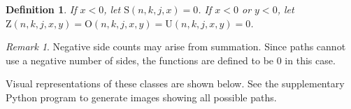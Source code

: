 \documentclass[a4paper, 12pt] {article}
\theoremstyle{remark}
\newtheorem*{remark}{Remark}
\theoremstyle{plain}
\newtheorem{definition}{Definition}[theorem]
\theoremstyle{remark}
\begin{document}
\begin{definition}
\label{nonnegative_side}
If $x<0$, let $\mathrm{S}(n,k,j,x)=0$.
If $x<0$ or $y<0$, let $\mathrm{Z}(n,k,j,x,y)=\mathrm{O}(n,k,j,x,y)=\mathrm{U}(n,k,j,x,y)=0$.
\end{definition}

\begin{remark}
Negative side counts may arise from summation. Since paths cannot use a negative number of sides, the functions are defined to be $0$ in this case.
\end{remark}

Visual representations of these classes are shown below.
See the supplementary Python program to generate images showing all possible paths.


\begin{comment}
Let $\mathbb{Z}_j$, $\mathbb{S}_j$, $\mathbb{O}_j$ be the subclass of $\mathbb{Z}$, $\mathbb{S}$, $\mathbb{O}$ such that all $\{p_k\} \in \mathbb{Z}_j$, $\mathbb{S}_j$, $\mathbb{O}_j$ have no $j$ \textit{consecutive} respectively.
Let $\mathbb{O}_{j}^{c}$ be the subclass of $\mathbb{O}$ such that all $\{p_k\} \in \mathbb{O}_{j}^{c}$ have no $j$ \textit{cyclic-consecutive}.

Let $\mathbb{Z}_j$ be the subclass of $\mathbb{Z}$ such that all $\{p_k\} \in \mathbb{Z}_j$ have no $j$ \textit{consecutive}.
Let $\mathbb{S}_j$ be the subclass of $\mathbb{S}$ such that all $\{p_k\} \in \mathbb{S}_j$ have no $j$ \textit{consecutive}.
Let $\mathbb{O}_j$ be the subclass of $\mathbb{O}$ such that all $\{p_k\} \in \mathbb{O}_j$ have no $j$ \textit{consecutive}.

Let ${\stackrel{x \rightarrow y}{\mathbb{Z}}}_{\hspace{-0.175cm} j} (n, k)$ be the set of $k$-permutations in $\mathbb{Z}_j$ which start with $x$ consecutive sides and end with $y$ consecutive sides.
Let ${\stackrel{x}{\mathbb{S}}}_{j} (n, k)$ be the set of $k$-permutations in $\mathbb{S}_j$ which start with $x$ consecutive sides.
Let ${\stackrel{x \_ y}{\mathbb{O}}}_{\hspace{-0.075cm} j} (n, k)$ and $\stackrel{x \_ y \ }{\mathbb{O}_{j}^{c}} \hspace{-0.14cm} (n, k)$ be the set of $k$-permutations in $\mathbb{O}_j$ and $\mathbb{O}_{j}^{c}$ respectively which use $x$ and $y$ consecutive sides to the left and right of $[1, n]$ respectively.
Let $\textrm{Z}_{j}(n, k)$ be the number of $k$-permutations in $\mathbb{Z}_{j}(n, k)$.
\end{comment}
\end{document}
